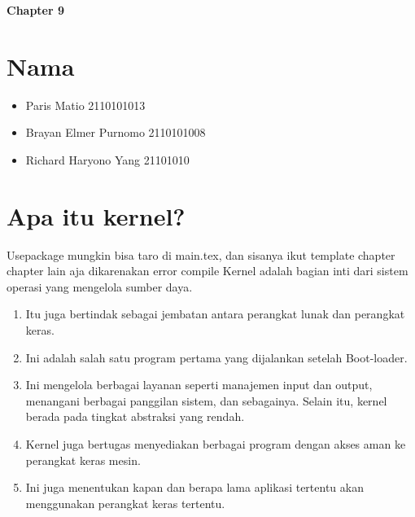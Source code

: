 \documentclass{article}
\begin{document}
	\begin{titlepage}
		\begin{center}
	
	
	\textbf{\huge Chapter 9}
	\section*{Nama}
	\begin{varwidth}{\textwidth}
		\begin{itemize}
			\item Paris Matio 2110101013
			\item Brayan Elmer Purnomo 2110101008
			\item Richard Haryono Yang 21101010
		\end{itemize}
	\end{varwidth}
		\end{center}
	\end{titlepage}
	\section{Apa itu kernel?}
	
Usepackage mungkin bisa taro di main.tex, dan sisanya ikut template chapter chapter lain aja dikarenakan error compile
	Kernel adalah bagian inti dari sistem operasi yang mengelola sumber daya. 
	
	\begin{enumerate}
	
	\item Itu juga bertindak sebagai jembatan antara perangkat lunak dan perangkat keras. 
	
	\item Ini adalah salah satu program pertama yang dijalankan setelah Boot-loader.
	
	\item Ini mengelola berbagai layanan seperti manajemen input dan output, menangani berbagai panggilan sistem, dan sebagainya. Selain itu, kernel berada pada tingkat abstraksi yang rendah.
	
	\item Kernel juga bertugas menyediakan berbagai program dengan akses aman ke perangkat keras mesin. 
	
	\item Ini juga menentukan kapan dan berapa lama aplikasi tertentu akan menggunakan perangkat keras tertentu.
	
	\end{enumerate}	

	\vskip0.5cm
\end{document}
